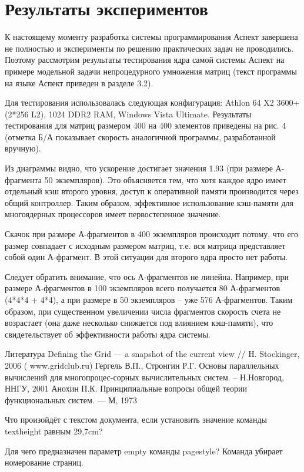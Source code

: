 \documentclass[11pt]{article}
\begin{document}
\section{Результаты экспериментов}
К настоящему моменту разработка системы программирования Аспект завершена не полностью и эксперименты по решению практических задач не проводились. Поэтому рассмотрим результаты тестирования ядра самой системы Аспект на примере модельной задачи непроцедурного умножения матриц (текст программы на языке Аспект приведен в разделе 3.2).\par
Для тестирования использовалась следующая конфигурация: Athlon 64 X2 3600+ (2*256 L2), 1024 DDR2 RAM, Windows Vista Ultimate. Результаты тестирования для матриц размером 400 на 400 элементов приведены на рис. 4 (отметка Б/А показывает скорость аналогичной программы, разработанной вручную).\par
Из диаграммы видно, что ускорение достигает значения 1.93 (при размере А-фрагмента 50 экземпляров). Это объясняется тем, что хотя каждое ядро имеет отдельный кэш второго уровня, доступ к оперативной памяти производится через общий контроллер. Таким образом, эффективное использование кэш-памяти для многоядерных процессоров имеет первостепенное значение.\par
Скачок при размере А-фрагментов в 400 экземпляров происходит потому, что его размер совпадает с исходным размером матриц, т.е. вся матрица представляет собой один А-фрагмент. В этой ситуации для второго ядра просто нет работы.\par
Следует обратить внимание, что ось А-фрагментов не линейна. Например, при размере 
А-фрагментов в 100 экземпляров всего получается 80 А-фрагментов (4*4*4 + 4*4), а при размере в 50 экземпляров – уже 576 А-фрагментов. Таким образом, при существенном увеличении числа фрагментов скорость счета не возрастает (она даже несколько снижается под влиянием кэш-памяти), что свидетельствует об эффективности работы ядра системы.\par


\begin{thebibliography}{Литература}
Defining the Grid — a snapshot of the current view // H. Stockinger, 2006 ( www.gridclub.ru)
Гергель В.П., Стронгин Р.Г. Основы параллельных вычислений для многопроцес-сорных вычислительных систем. – Н.Новгород, ННГУ, 2001
Анохин П.К. Принципиальные вопросы общей теории функциональных систем. — М, 1973
\end{thebibliography}
Что произойдёт с текстом документа, если установить значение команды textheight  равным 29,7cm?

Для чего предназначен параметр empty команды pagestyle?
Команда убирает номерование страниц.
\end{document}

